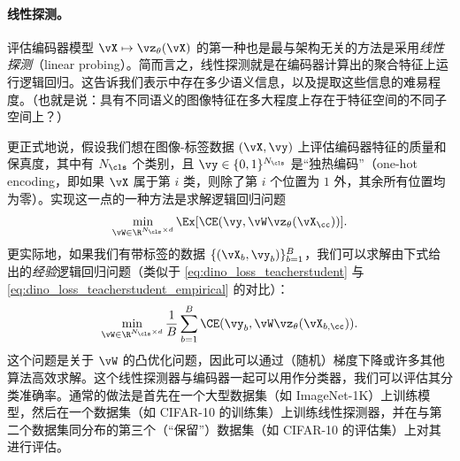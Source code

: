 \documentclass[../../book-main_zh.tex]{subfiles}
\begin{document}
\paragraph{线性探测。}

评估编码器模型 \(\vX \mapsto \vz_{\theta}(\vX)\) 的第一种也是最与架构无关的方法是采用\textit{线性探测}（linear probing）。简而言之，线性探测就是在编码器计算出的聚合特征上运行逻辑回归。这告诉我们表示中存在多少语义信息，以及提取这些信息的难易程度。（也就是说：具有不同语义的图像特征在多大程度上存在于特征空间的不同子空间上？）

更正式地说，假设我们想在图像-标签数据 \((\vX, \vy)\) 上评估编码器特征的质量和保真度，其中有 \(N_{\cls}\) 个类别，且 \(\vy \in \{0, 1\}^{N_{\cls}}\) 是“独热编码”（one-hot encoding，即如果 \(\vX\) 属于第 \(i\) 类，则除了第 \(i\) 个位置为 \(1\) 外，其余所有位置均为零）。实现这一点的一种方法是求解逻辑回归问题
\begin{equation}\label{eq:linear_probing}
\min_{\vW \in \R^{N_{\cls} \times d}}\Ex[\CE(\vy, \vW \vz_{\theta}(\vX_{\cc}))].
\end{equation}
更实际地，如果我们有带标签的数据 \(\{(\vX_{b}, \vy_{b})\}_{b = 1}^{B}\)，我们可以求解由下式给出的\textit{经验}逻辑回归问题（类似于 \eqref{eq:dino_loss_teacherstudent} 与 \eqref{eq:dino_loss_teacherstudent_empirical} 的对比）：
\begin{equation}\label{eq:linear_probing_empirical}
\min_{\vW \in \R^{N_{\cls} \times d}}\frac{1}{B}\sum_{b =
1}^{B}\CE(\vy_{b}, \vW \vz_{\theta}(\vX_{b, \cc})).
\end{equation}
这个问题是关于 \(\vW\) 的凸优化问题，因此可以通过（随机）梯度下降或许多其他算法高效求解。这个线性探测器与编码器一起可以用作分类器，我们可以评估其分类准确率。通常的做法是首先在一个大型数据集（如 ImageNet-1K）上训练模型，然后在一个数据集（如 CIFAR-10 的训练集）上训练线性探测器，并在与第二个数据集同分布的第三个（“保留”）数据集（如 CIFAR-10 的评估集）上对其进行评估。
\end{document}
